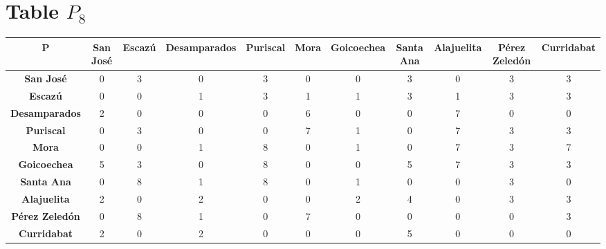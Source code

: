 \documentclass{article}
\begin{document}
\section{Table $P_{8}$}
\begin{center}
    \begin{tabular}{|c||c|c|c|c|c|c|c|c|c|c|}
        \hline
        \textbf{P} & \textbf{San José} & \textbf{Escazú} & \textbf{Desamparados} & \textbf{Puriscal} & \textbf{Mora} & \textbf{Goicoechea} & \textbf{Santa Ana} & \textbf{Alajuelita} & \textbf{Pérez Zeledón} & \textbf{Curridabat} \\
        \hline
        \hline
        \textbf{San José}& 0 & 3 & 0 & 3 & 0 & 0 & 3 & 0 & 3 & 3 \\
        \hline
        \textbf{Escazú}& 0 & 0 & 1 & 3 & 1 & 1 & 3 & 1 & 3 & 3 \\
        \hline
        \textbf{Desamparados}& 2 & 0 & 0 & 0 & 6 & 0 & 0 & 7 & 0 & 0 \\
        \hline
        \textbf{Puriscal}& 0 & 3 & 0 & 0 & 7 & 1 & 0 & 7 & 3 & 3 \\
        \hline
        \textbf{Mora}& 0 & 0 & 1 & \cellcolor[HTML]{D74894}$8$ & 0 & 1 & 0 & 7 & 3 & 7 \\
        \hline
        \textbf{Goicoechea}& 5 & 3 & 0 & \cellcolor[HTML]{D74894}$8$ & 0 & 0 & 5 & 7 & 3 & 3 \\
        \hline
        \textbf{Santa Ana}& 0 & \cellcolor[HTML]{D74894}$8$ & 1 & \cellcolor[HTML]{D74894}$8$ & 0 & 1 & 0 & 0 & 3 & 0 \\
        \hline
        \textbf{Alajuelita}& 2 & 0 & 2 & 0 & 0 & 2 & 4 & 0 & 3 & 3 \\
        \hline
        \textbf{Pérez Zeledón}& 0 & \cellcolor[HTML]{D74894}$8$ & 1 & 0 & 7 & 0 & 0 & 0 & 0 & 3 \\
        \hline
        \textbf{Curridabat}& 2 & 0 & 2 & 0 & 0 & 0 & 5 & 0 & 0 & 0 \\
        \hline
    \end{tabular}
\end{center}
\end{document}
